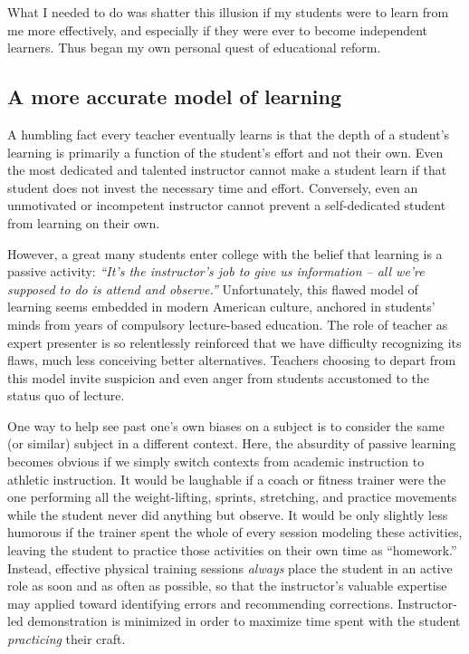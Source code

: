 \vskip 10pt

What I needed to do was shatter this illusion if my students were to learn from me more effectively, and especially if they were ever to become independent learners.  Thus began my own personal quest of educational reform.





\filbreak
\subsection{A more accurate model of learning}

A humbling fact every teacher eventually learns is that the depth of a student's learning is primarily a function of the student's effort and not their own.  Even the most dedicated and talented instructor cannot make a student learn if that student does not invest the necessary time and effort.  Conversely, even an unmotivated or incompetent instructor cannot prevent a self-dedicated student from learning on their own.

However, a great many students enter college with the belief that learning is a passive activity: \textit{``It's the instructor's job to give us information -- all we're supposed to do is attend and observe.''}   Unfortunately, this flawed model of learning seems embedded in modern American culture, anchored in students' minds from years of compulsory lecture-based education.  The role of teacher as expert presenter is so relentlessly reinforced that we have difficulty recognizing its flaws, much less conceiving better alternatives.  Teachers choosing to depart from this model invite suspicion and even anger from students accustomed to the status quo of lecture.

One way to help see past one's own biases on a subject is to consider the same (or similar) subject in a different context.  Here, the absurdity of passive learning becomes obvious if we simply switch contexts from academic instruction to athletic instruction.  It would be laughable if a coach or fitness trainer were the one performing all the weight-lifting, sprints, stretching, and practice movements while the student never did anything but observe.  It would be only slightly less humorous if the trainer spent the whole of every session modeling these activities, leaving the student to practice those activities on their own time as ``homework.''  Instead, effective physical training sessions \textit{always} place the student in an active role as soon and as often as possible, so that the instructor's valuable expertise may applied toward identifying errors and recommending corrections.  Instructor-led demonstration is minimized in order to maximize time spent with the student \textit{practicing} their craft.

